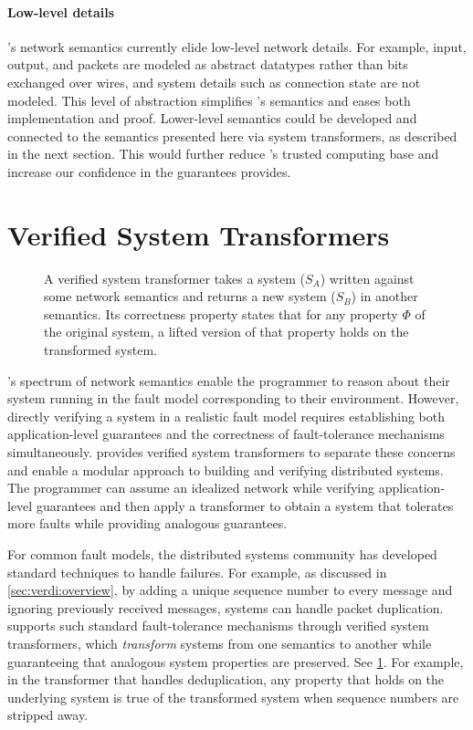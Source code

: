 \paragraph{Low-level details}

\Verdi's network semantics currently elide low-level network details.
%
For example, input, output, and packets are modeled as abstract datatypes
rather than bits exchanged over wires, and system details such as
connection state are not modeled.
%
This level of abstraction simplifies \Verdi's semantics and eases both
implementation and proof.
%
Lower-level semantics could be developed and connected to the semantics
presented here via system transformers, as described in the next section.
%
This would further reduce \Verdi's trusted computing base and increase our
confidence in the guarantees \Verdi provides.

\section{Verified System Transformers}
\label{sec:verdi:libraries}

\begin{figure}
  \centering
  
  \caption{A verified system transformer takes a system ($S_A$) written
    against some network semantics and returns a new system ($S_B$) in
    another semantics. Its correctness property states that for any
    property $\Phi$ of the original system, a lifted version of that
    property holds on the transformed system.}
  \label{fig:vst}
\end{figure}

\Verdi's spectrum of network semantics enable the programmer to reason
about their system running in the fault model corresponding to their
environment. However, directly verifying a system in a realistic fault
model requires establishing both application-level guarantees and the
correctness of fault-tolerance mechanisms simultaneously.  \Verdi
provides verified system transformers to separate these concerns and
enable a modular approach to building and verifying distributed
systems. The programmer can assume an idealized network while
verifying application-level guarantees and then apply a transformer to
obtain a system that tolerates more faults while providing analogous guarantees.

For common fault models, the distributed systems community has
developed standard techniques to handle failures. For example, as
discussed in \cref{sec:verdi:overview}, by adding a unique sequence
number to every message and ignoring previously received messages,
systems can handle packet duplication. \Verdi supports such
standard fault-tolerance mechanisms through verified system transformers,
which \emph{transform} systems from one semantics to another while
guaranteeing that analogous system properties are preserved. See \cref{fig:vst}.
For example, in the transformer that handles deduplication, any property
that holds on the underlying system is true of the transformed
system when sequence numbers are stripped away.


